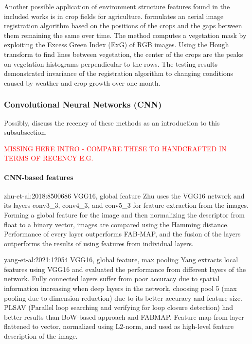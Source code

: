 Another possible application of environment structure features found in the included works is in crop fields for agriculture.
\cite{chebrolu-et-al:2018:2849603} formulates an aerial image registration algorithm based on the positions of the crops and the gaps between them remaining the same over time. The method computes a vegetation mask by exploiting the Excess Green Index (ExG) of RGB images. Using the Hough transform to find lines between vegetation, the center of the crops are the peaks on vegetation histograms perpendicular to the rows.
The testing results demonstrated invariance of the registration algorithm to changing conditions caused by weather and crop growth over one month.



\subsubsection{Convolutional Neural Networks (CNN)}

Possibly, discuss the recency of these methods as an introduction to this subsubsection.

\textcolor{red}{MISSING HERE INTRO - COMPARE THESE TO HANDCRAFTED IN TERMS OF RECENCY E.G.}

\paragraph{CNN-based features}




zhu-et-al:2018:8500686 VGG16, global feature
Zhu uses the VGG16 network and its layers conv3\_3, conv4\_3, and conv5\_3 for feature extraction from the images. Forming a global feature for the image and then normalizing the descriptor from float to a binary vector, images are compared using the Hamming distance.
Performance of every layer outperforms FAB-MAP, and the fusion of the layers outperforms the results of using features from individual layers.

yang-et-al:2021:12054 VGG16, global feature, max pooling
Yang extracts local features using VGG16 and evaluated the performance from different layers of the network. Fully connected layers suffer from poor accuracy due to spatial information increasing when deep layers in the network, choosing pool 5 (max pooling due to dimension reduction) due to its better accuracy and feature size.
PLSAV (Parallel loop searching and verifying for loop closure
detection) had better results than BoW-based approach and FABMAP.
Feature map from layer flattened to vector, normalized using L2-norm, and used as high-level feature description of the image.



